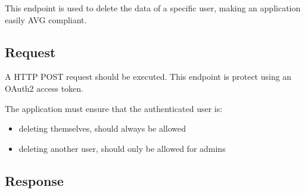 This endpoint is used to delete the data of a specific user, making an application easily AVG compliant.

\subsection{Request}
\label{subsec:request-delete-user-data}

A HTTP POST request should be executed.
This endpoint is protect using an OAuth2 access token.

The application must ensure that the authenticated user is:
\begin{itemize}
    \item deleting themselves, should always be allowed
    \item deleting another user, should only be allowed for admins
\end{itemize}




\subsection{Response}
\label{subsec:response-delete-user-data}


